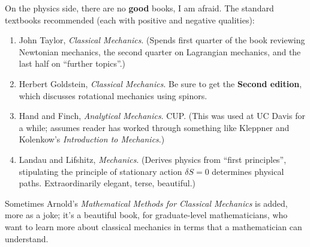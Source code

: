 On the physics side, there are no \textbf{good} books, I am afraid. The
standard textbooks recommended (each with positive and negative
qualities):
\begin{enumerate}
\item John Taylor, \emph{Classical Mechanics}. (Spends first quarter of
the book reviewing Newtonian mechanics, the second quarter on Lagrangian
mechanics, and the last half on ``further topics''.)
\item Herbert Goldstein, \emph{Classical Mechanics}. Be sure to get
the \textbf{Second edition}, which discusses rotational mechanics using spinors.
\item Hand and Finch, \emph{Analytical Mechanics}. CUP. (This was used
at UC Davis for a while; assumes reader has worked through something
like Kleppner and Kolenkow's \emph{Introduction to Mechanics}.)
\item Landau and Lifshitz, \emph{Mechanics}. (Derives physics from
``first principles'', stipulating the principle of stationary action
$\delta S=0$ determines physical paths. Extraordinarily elegant, terse, beautiful.)
\end{enumerate}
Sometimes Arnold's \emph{Mathematical Methods for Classical Mechanics}
is added, more as a joke; it's a beautiful book, for graduate-level
mathematicians, who want to learn more about classical mechanics in
terms that a mathematician can understand.

